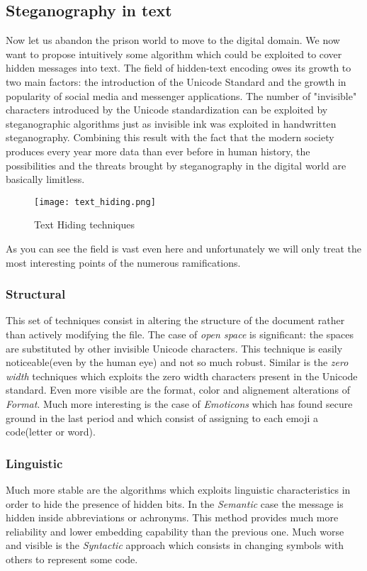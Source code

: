 \documentclass[../../main.tex]{subfiles}
\begin{document}
\subsection{Steganography in text}
Now let us abandon the prison world to move to the digital domain.
We now want to propose intuitively some algorithm which could be exploited
to cover hidden messages into text.
The field of hidden-text encoding owes its growth to two main factors: the
introduction of the Unicode Standard and the growth in popularity of social
media and messenger applications.
The number of "invisible" characters introduced by the Unicode
standardization can be exploited by steganographic algorithms just as
invisible ink was exploited in handwritten steganography.
Combining this result with the fact that the modern society produces every
year more data than ever before in human history, the possibilities and the
threats brought by steganography in the digital world are basically
limitless.

\begin{figure}[h]
    \centering
    \caption{Text Hiding techniques}
    \texttt{[image: text\_hiding.png]}
\end{figure}

As you can see the field is vast even here and unfortunately we will only
treat the most interesting points of the numerous ramifications.

\subsubsection{Structural}
This set of techniques consist in altering the structure of the document
rather than actively modifying the file. The case of \emph{open space} is
significant: the spaces are substituted by other invisible Unicode
characters.
This technique is easily noticeable(even by the human eye) and not so much
robust.
Similar is the \emph{zero width} techniques which exploits the zero width
characters present in the Unicode standard.
Even more visible are the format, color and alignement alterations of
\emph{Format}.
Much more interesting is the case of \emph{Emoticons} which has found secure
ground in the last period and which consist of assigning to each emoji a
code(letter or word).

\subsubsection{Linguistic}
Much more stable are the algorithms which exploits linguistic
characteristics in order to hide the presence of hidden bits.
In the \emph{Semantic} case the message is hidden inside abbreviations or
achronyms.
This method provides much more reliability and lower embedding capability
than the previous one.
Much worse and visible is the \emph{Syntactic} approach which consists in
changing symbols with others to represent some code.
\end{document}
